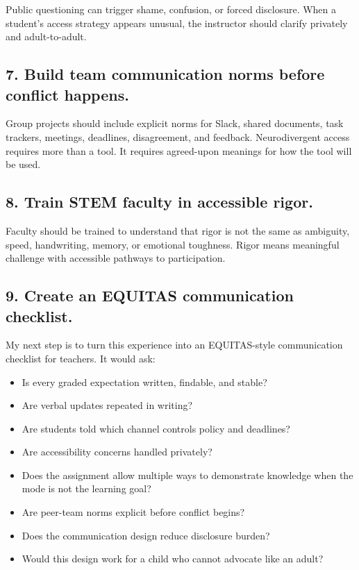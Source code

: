 \documentclass[12pt]{article}
\begin{document}
Public questioning can trigger shame, confusion, or forced disclosure. When a student's access strategy appears unusual, the instructor should clarify privately and adult-to-adult.

\subsection*{7. Build team communication norms before conflict happens.}

Group projects should include explicit norms for Slack, shared documents, task trackers, meetings, deadlines, disagreement, and feedback. Neurodivergent access requires more than a tool. It requires agreed-upon meanings for how the tool will be used.

\subsection*{8. Train STEM faculty in accessible rigor.}

Faculty should be trained to understand that rigor is not the same as ambiguity, speed, handwriting, memory, or emotional toughness. Rigor means meaningful challenge with accessible pathways to participation.

\subsection*{9. Create an EQUITAS communication checklist.}

My next step is to turn this experience into an EQUITAS-style communication checklist for teachers. It would ask:

\begin{itemize}
    \item Is every graded expectation written, findable, and stable?
    \item Are verbal updates repeated in writing?
    \item Are students told which channel controls policy and deadlines?
    \item Are accessibility concerns handled privately?
    \item Does the assignment allow multiple ways to demonstrate knowledge when the mode is not the learning goal?
    \item Are peer-team norms explicit before conflict begins?
    \item Does the communication design reduce disclosure burden?
    \item Would this design work for a child who cannot advocate like an adult?
\end{itemize}
\end{document}
